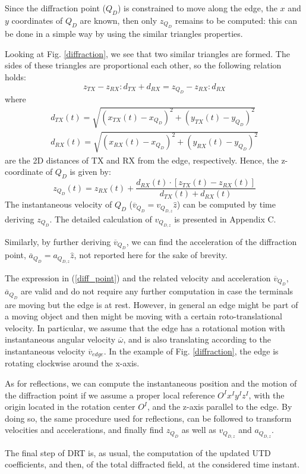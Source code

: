 Since the diffraction point ($Q_D$) is constrained to move along the edge, the $x$ and $y$ coordinates of $Q_D$ are known, then only $z_{Q_D}$ remains to be computed: this can be done in a simple way by using the similar triangles properties.  \par
Looking at Fig. \ref{diffraction}, we see that two similar triangles are formed. The sides of these triangles are proportional each other, so the following relation holds: 
\begin{equation}
z_{TX}-z_{RX} : d_{TX}+d_{RX} = z_{Q_D}-z_{RX} : d_{RX}
\end{equation} 
where 
\begin{equation}
\begin{gathered}
d_{TX}(t) = \sqrt{(x_{TX}(t)-x_{Q_D})^2+(y_{TX}(t)-y_{Q_D})^2} \\[1ex]
d_{RX}(t) = \sqrt{(x_{RX}(t)-x_{Q_D})^2+(y_{RX}(t)-y_{Q_D})^2}
\end{gathered}
\label{dist2D_TXRX}
\end{equation}
are the 2D distances of TX and RX from the edge, respectively. Hence, the z-coordinate of $Q_D$ is given by: 
\begin{equation}
z_{Q_D}(t) = z_{RX}(t) + \frac{d_{RX}(t)\cdot[z_{TX}(t)-z_{RX}(t)]}{d_{TX}(t)+d_{RX}(t)}
\label{diff_point}
\end{equation}
The instantaneous velocity of $Q_D$ ($\overline{v}_{Q_D}=v_{Q_{D,z}}\hat{z}$) can be computed by time deriving $z_{Q_D}$. The detailed calculation of $v_{Q_{D,z}}$ is presented in Appendix C.\par
Similarly, by further deriving $\overline{v}_{Q_D}$, we can find the acceleration of the diffraction point, $\overline{a}_{Q_D}=a_{Q_{D,z}}\hat{z}$, not reported here for the sake of brevity.\par
The expression in (\ref{diff_point}) and the related velocity and acceleration $\overline{v}_{Q_D}$, $\overline{a}_{Q_D}$ are valid and do not require any further computation in case the terminals are moving but the edge is at rest. However, in general an edge might be part of a moving object and then might be moving with a certain roto-translational velocity. In particular, we assume that the edge has a rotational motion with instantaneous angular velocity $\overline{\omega}$, and is also translating according to the instantaneous velocity $\overline{v}_{edge}$. In the example of Fig. \ref{diffraction}, the edge is rotating clockwise around the x-axis. 

As for reflections, we can compute the instantaneous position and the motion of the diffraction point if we assume a proper local reference $O^Ix^Iy^Iz^I$, with the origin located in the rotation center $O^I$, and the z-axis parallel to the edge. By doing so, the same procedure used for reflections, can be followed to transform velocities and accelerations, and finally find $z_{Q_D}$ as well as $v_{Q_{D,z}}$ and $a_{Q_{D,z}}$.  \par 
The final step of DRT is, as usual, the computation of the updated UTD coefficients, and then, of the total diffracted field, at the considered time instant.

